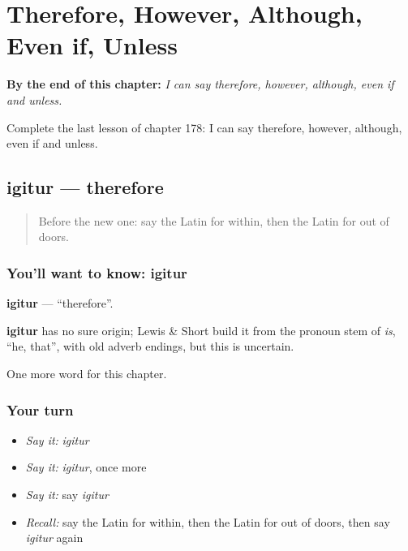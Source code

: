 
\chapter{Therefore, However, Although, Even if, Unless}
\label{ch:la-therefore-however-although-even-if-unless}

\begin{chapteropening}
\textbf{By the end of this chapter:} \emph{I can say therefore, however, although, even if and unless.}

Complete the last lesson of chapter 178: I can say therefore, however, although, even if and unless.
\end{chapteropening}

\section[igitur]{igitur — therefore}

\label{lesson:LA-C178-igitur}



\begin{quote}
Before the new one: say the Latin for within, then the Latin for out of doors.
\end{quote}

\subsection*{You'll want to know: igitur}
\textbf{igitur} — \textquotedblleft{}therefore\textquotedblright{}.

\begin{cousinweb}
\textbf{igitur} has no sure origin; Lewis \& Short build it from the pronoun stem of \emph{is}, \textquotedblleft{}he, that\textquotedblright{}, with old adverb endings, but this is uncertain.
\end{cousinweb}

\begin{grammarlens}[title={What you've built}]
One more word for this chapter.
\end{grammarlens}

\subsection*{Your turn}
\begin{itemize}
\raggedright
  \item \emph{Say it:} \emph{igitur}
  \item \emph{Say it:} \emph{igitur}, once more
  \item \emph{Say it:} say \emph{igitur}
  \item \emph{Recall:} say the Latin for within, then the Latin for out of doors, then say \emph{igitur} again
\end{itemize}

